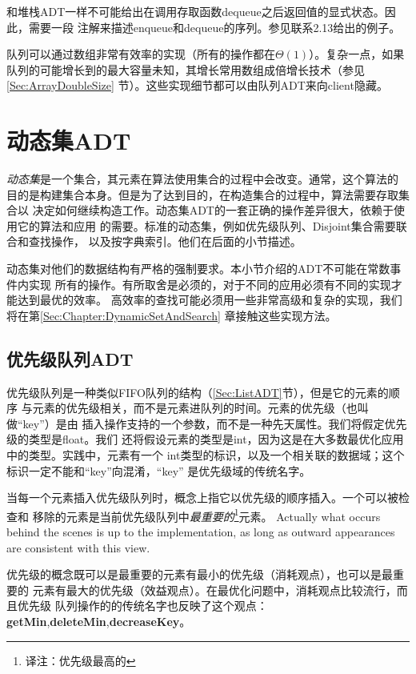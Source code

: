 和堆栈ADT一样不可能给出在调用存取函数dequeue之后返回值的显式状态。因此，需要一段
注解来描述enqueue和dequeue的序列。参见联系2.13给出的例子。

队列可以通过数组非常有效率的实现（所有的操作都在$\Theta(1)$）。复杂一点，如果
队列的可能增长到的最大容量未知，其增长常用数组成倍增长技术（参见\ref{Sec:ArrayDoubleSize}
节）。这些实现细节都可以由队列ADT来向client隐藏。

\section{动态集ADT}
\emph{动态集}是一个集合，其元素在算法使用集合的过程中会改变。通常，这个算法的
目的是构建集合本身。但是为了达到目的，在构造集合的过程中，算法需要存取集合以
决定如何继续构造工作。动态集ADT的一套正确的操作差异很大，依赖于使用它的算法和应用
的需要。标准的动态集，例如优先级队列、Disjoint集合需要联合和查找操作，
以及按字典索引。他们在后面的小节描述。

动态集对他们的数据结构有严格的强制要求。本小节介绍的ADT不可能在常数事件内实现
所有的操作。有所取舍是必须的，对于不同的应用必须有不同的实现才能达到最优的效率。
高效率的查找可能必须用一些非常高级和复杂的实现，我们将在第\ref{Sec:Chapter:DynamicSetAndSearch}
章接触这些实现方法。

\subsection{优先级队列ADT}\label{Sec:ADTPriorityQueue}
优先级队列是一种类似FIFO队列的结构（\ref{Sec:ListADT}节），但是它的元素的顺序
与元素的优先级相关，而不是元素进队列的时间。元素的优先级（也叫做“key”）是由
插入操作支持的一个参数，而不是一种先天属性。我们将假定优先级的类型是float。我们
还将假设元素的类型是int，因为这是在大多数最优化应用中的类型。实践中，元素有一个
int类型的标识，以及一个相关联的数据域；这个标识一定不能和“key”向混淆，“key”
是优先级域的传统名字。

当每一个元素插入优先级队列时，概念上指它以优先级的顺序插入。一个可以被检查和
移除的元素是当前优先级队列中\emph{最重要的}\footnote{译注：优先级最高的}元素。
Actually what occurs behind the scenes is up to the implementation, as long as
 outward appearances are consistent with this view.

优先级的概念既可以是最重要的元素有最小的优先级（消耗观点），也可以是最重要的
元素有最大的优先级（效益观点）。在最优化问题中，消耗观点比较流行，而且优先级
队列操作的的传统名字也反映了这个观点：
\textbf{getMin},\textbf{deleteMin},\textbf{decreaseKey}。

